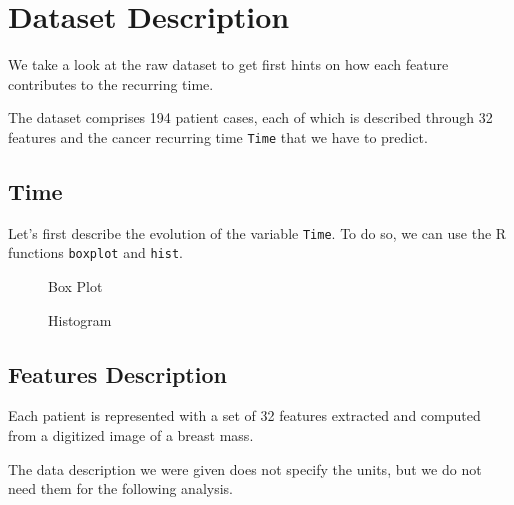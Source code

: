 \documentclass[]{report}
\begin{document}
\section{Dataset Description}
We take a look at the raw dataset to get first hints on how each feature contributes to the recurring time.

The dataset comprises 194 patient cases, each of which is described through 32 features and the cancer recurring time \texttt{Time} that we have to predict.

\subsection{Time}
Let's first describe the evolution of the variable \texttt{Time}. To do so, we can use the R functions \texttt{boxplot} and \texttt{hist}.

\begin{figure}[!hb]
	\centering
	
	\caption{Box Plot}
\end{figure}

\begin{figure}[!hb]
	\centering
	
	\caption{Histogram}
\end{figure}

\subsection{Features Description}
Each patient is represented with a set of 32 features extracted and computed from a digitized image of a breast mass. 

The data description we were given does not specify the units, but we do not need them for the following analysis.
\end{document}
